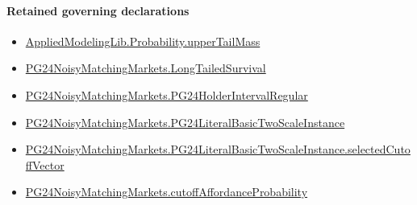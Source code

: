 \documentclass[10pt]{article}
\begin{document}
\paragraph{Retained governing declarations}
\begin{itemize}\raggedright
\item \hyperlink{governing-declaration-f983ca9c59dc317f}{Applied\allowbreak{}Modeling\allowbreak{}Lib.\allowbreak{}Probability.\allowbreak{}upper\allowbreak{}Tail\allowbreak{}Mass}
\item \hyperlink{governing-declaration-e6c10c02961c0451}{PG24\allowbreak{}Noisy\allowbreak{}Matching\allowbreak{}Markets.\allowbreak{}Long\allowbreak{}Tailed\allowbreak{}Survival}
\item \hyperlink{governing-declaration-34ba25842cf90e86}{PG24\allowbreak{}Noisy\allowbreak{}Matching\allowbreak{}Markets.\allowbreak{}PG24\allowbreak{}Holder\allowbreak{}Interval\allowbreak{}Regular}
\item \hyperlink{governing-declaration-908406134a9242b1}{PG24\allowbreak{}Noisy\allowbreak{}Matching\allowbreak{}Markets.\allowbreak{}PG24\allowbreak{}Literal\allowbreak{}Basic\allowbreak{}Two\allowbreak{}Scale\allowbreak{}Instance}
\item \hyperlink{governing-declaration-556c38ab236724e0}{PG24\allowbreak{}Noisy\allowbreak{}Matching\allowbreak{}Markets.\allowbreak{}PG24\allowbreak{}Literal\allowbreak{}Basic\allowbreak{}Two\allowbreak{}Scale\allowbreak{}Instance.\allowbreak{}selected\allowbreak{}Cutoff\allowbreak{}Vector}
\item \hyperlink{governing-declaration-a4a2a08d89f647e4}{PG24\allowbreak{}Noisy\allowbreak{}Matching\allowbreak{}Markets.\allowbreak{}cutoff\allowbreak{}Affordance\allowbreak{}Probability}
\end{itemize}
\end{document}
